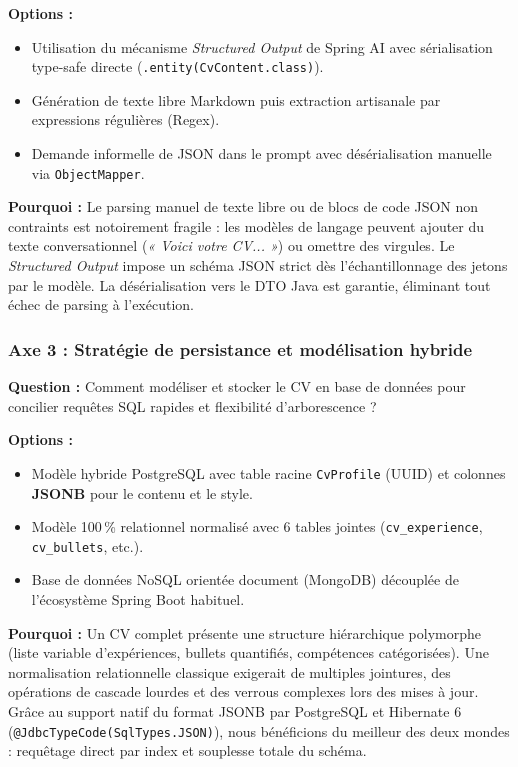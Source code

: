 \documentclass[11pt,a4paper]{article}
\begin{document}
\textbf{Options :}
\begin{itemize}
    \item[$\boxtimes$] Utilisation du mécanisme \textit{Structured Output} de Spring AI avec sérialisation type-safe directe (\texttt{.entity(CvContent.class)}).
    \item[$\square$] Génération de texte libre Markdown puis extraction artisanale par expressions régulières (Regex).
    \item[$\square$] Demande informelle de JSON dans le prompt avec désérialisation manuelle via \texttt{ObjectMapper}.
\end{itemize}

\textbf{Pourquoi :} Le parsing manuel de texte libre ou de blocs de code JSON non contraints est notoirement fragile : les modèles de langage peuvent ajouter du texte conversationnel (\textit{« Voici votre CV... »}) ou omettre des virgules. Le \textit{Structured Output} impose un schéma JSON strict dès l'échantillonnage des jetons par le modèle. La désérialisation vers le DTO Java est garantie, éliminant tout échec de parsing à l'exécution.

\subsubsection{Axe 3 : Stratégie de persistance et modélisation hybride}
\textbf{Question :} Comment modéliser et stocker le CV en base de données pour concilier requêtes SQL rapides et flexibilité d'arborescence ?

\textbf{Options :}
\begin{itemize}
    \item[$\boxtimes$] Modèle hybride PostgreSQL avec table racine \texttt{CvProfile} (UUID) et colonnes \textbf{JSONB} pour le contenu et le style.
    \item[$\square$] Modèle 100\,\% relationnel normalisé avec 6 tables jointes (\texttt{cv\_experience}, \texttt{cv\_bullets}, etc.).
    \item[$\square$] Base de données NoSQL orientée document (MongoDB) découplée de l'écosystème Spring Boot habituel.
\end{itemize}

\textbf{Pourquoi :} Un CV complet présente une structure hiérarchique polymorphe (liste variable d'expériences, bullets quantifiés, compétences catégorisées). Une normalisation relationnelle classique exigerait de multiples jointures, des opérations de cascade lourdes et des verrous complexes lors des mises à jour. Grâce au support natif du format JSONB par PostgreSQL et Hibernate 6 (\texttt{@JdbcTypeCode(SqlTypes.JSON)}), nous bénéficions du meilleur des deux mondes : requêtage direct par index et souplesse totale du schéma.
\end{document}
